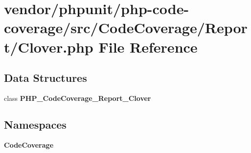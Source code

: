 \section{vendor/phpunit/php-\/code-\/coverage/src/\+Code\+Coverage/\+Report/\+Clover.php File Reference}
\label{_clover_8php}
\subsection*{Data Structures}
\begin{DoxyCompactItemize}
\item 
class {\bf P\+H\+P\+\_\+\+Code\+Coverage\+\_\+\+Report\+\_\+\+Clover}
\end{DoxyCompactItemize}
\subsection*{Namespaces}
\begin{DoxyCompactItemize}
\item 
 {\bf Code\+Coverage}
\end{DoxyCompactItemize}
